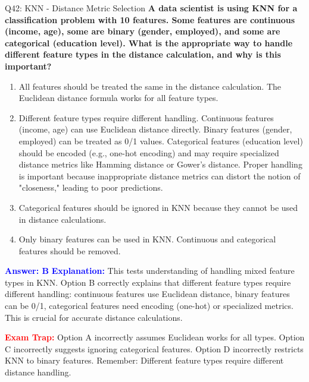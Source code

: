 \documentclass[8pt]{beamer}
\begin{document}
	\begin{frame}{Q42: KNN - Distance Metric Selection}
		\fontsize{6.5}{7.5}\selectfont
		\textbf{A data scientist is using KNN for a classification problem with 10 features. Some features are continuous (income, age), some are binary (gender, employed), and some are categorical (education level). What is the appropriate way to handle different feature types in the distance calculation, and why is this important?}
		
		\begin{enumerate}
			\item All features should be treated the same in the distance calculation. The Euclidean distance formula works for all feature types.
			\item Different feature types require different handling. Continuous features (income, age) can use Euclidean distance directly. Binary features (gender, employed) can be treated as 0/1 values. Categorical features (education level) should be encoded (e.g., one-hot encoding) and may require specialized distance metrics like Hamming distance or Gower's distance. Proper handling is important because inappropriate distance metrics can distort the notion of "closeness," leading to poor predictions.
			\item Categorical features should be ignored in KNN because they cannot be used in distance calculations.
			\item Only binary features can be used in KNN. Continuous and categorical features should be removed.
		\end{enumerate}
		
		\vspace{0.1cm}
		\textcolor{blue}{\textbf{Answer: B}}
		\vspace{0.1cm}
		\textcolor{blue}{\textbf{Explanation:}} This tests understanding of handling mixed feature types in KNN. Option B correctly explains that different feature types require different handling: continuous features use Euclidean distance, binary features can be 0/1, categorical features need encoding (one-hot) or specialized metrics. This is crucial for accurate distance calculations.
		
		\textcolor{red}{\textbf{Exam Trap:}} Option A incorrectly assumes Euclidean works for all types. Option C incorrectly suggests ignoring categorical features. Option D incorrectly restricts KNN to binary features. Remember: Different feature types require different distance handling.
	\end{frame}
	
\end{document}
